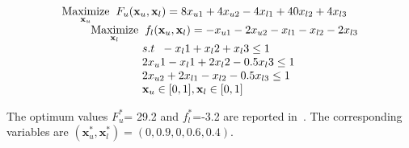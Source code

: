 \begin{equation}
\begin{array}{lr}
\underset{\mathbf{x}_u}{\text{Maximize}}\hspace{2mm} F_u(\mathbf{x}_u, \mathbf{ x}_l)=8x_{u1}+4x_{u2}-4x_{l1}+40x_{l2}+4x_{l3}\\


\hspace{9mm} \underset{\mathbf{x}_l} {\text{Maximize}}\hspace{2mm} f_l(\mathbf{x}_u, \mathbf{ x}_l)=-x_{u1}-2x_{u2}-x_{l1}-x_{l2}-2x_{l3} \\
\hspace{25mm}s.t\hspace{2mm} -x_l1+x_l2+x_l3\leq 1\\
\hspace{25mm} 2x_u1-x_l1+2x_l2-0.5x_l3\leq 1\\
\hspace{25mm} 2x_{u2}+2x_{l1}-x_{l2}-0.5x_{l3}\leq 1\\
\hspace{25mm} \mathbf{x}_u \in {[0,1]},\mathbf{x}_l \in [0,1] \\
\end{array}
\label{bltp_13}
\end{equation}

The optimum values $F_u^*$= 29.2 and  $f_l^*$=-3.2 are reported in~\cite{candler1982linear}. The corresponding variables are $(\mathbf{x}^*_u, \mathbf{x}^*_l)=(0,0.9,0,0.6,0.4).$
